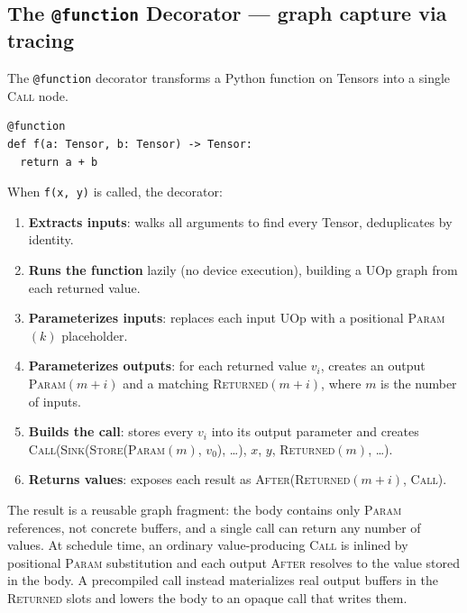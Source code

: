 \documentclass[10pt,letterpaper]{article}
\newcommand{\op}[1]{\textsc{#1}}
\begin{document}
\subsection*{{\color{callblue}The \texttt{@function} Decorator} \normalfont\small--- graph capture via tracing}

The \texttt{@function} decorator transforms a Python function on Tensors into a single \op{Call} node.

\begin{lstlisting}
@function
def f(a: Tensor, b: Tensor) -> Tensor:
  return a + b
\end{lstlisting}

When \texttt{f(x, y)} is called, the decorator:

\begin{enumerate}[leftmargin=1.5em, itemsep=2pt]
  \item \textbf{Extracts inputs}: walks all arguments to find every Tensor, deduplicates by identity.
  \item \textbf{Runs the function} lazily (no device execution), building a UOp graph from each returned value.
  \item \textbf{Parameterizes inputs}: replaces each input UOp with a positional \op{Param}$(k)$ placeholder.
  \item \textbf{Parameterizes outputs}: for each returned value $v_i$, creates an output \op{Param}$(m+i)$ and a matching \op{Returned}$(m+i)$, where $m$ is the number of inputs.
  \item \textbf{Builds the call}: stores every $v_i$ into its output parameter and creates\\
        \op{Call}(\op{Sink}(\op{Store}(\op{Param}$(m)$, $v_0$), \ldots), $x$, $y$, \op{Returned}$(m)$, \ldots).
  \item \textbf{Returns values}: exposes each result as \op{After}(\op{Returned}$(m+i)$, \op{Call}).
\end{enumerate}

The result is a reusable graph fragment: the body contains only \op{Param} references, not concrete buffers, and a single call can return any number of values. At schedule time, an ordinary value-producing \op{Call} is inlined by positional \op{Param} substitution and each output \op{After} resolves to the value stored in the body. A precompiled call instead materializes real output buffers in the \op{Returned} slots and lowers the body to an opaque call that writes them.

\end{document}
